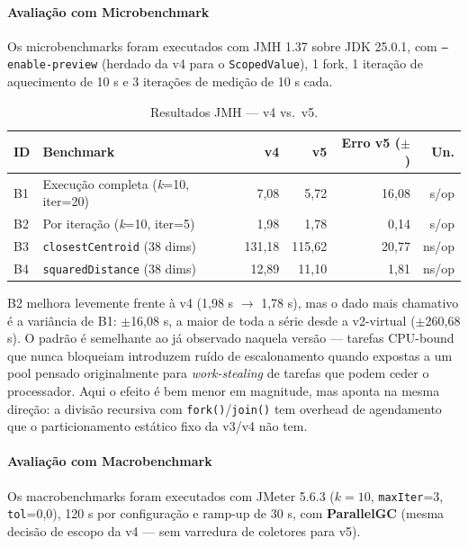 \paragraph{Avaliação com Microbenchmark}

Os microbenchmarks foram executados com JMH 1.37 sobre JDK 25.0.1, com
\texttt{--enable-preview} (herdado da v4 para o \texttt{ScopedValue}), 1
fork, 1 iteração de aquecimento de 10 s e 3 iterações de medição de 10 s
cada.

\begin{table}[H]
\centering
\begin{tabular}{lp{4.2cm}rrrr}
\hline
\textbf{ID} & \textbf{Benchmark} & \textbf{v4} & \textbf{v5} & \textbf{Erro v5 ($\pm$)} & \textbf{Un.} \\
\hline
B1 & Execução completa (\textit{k}=10, iter=20) & 7{,}08 & 5{,}72  & 16{,}08 & s/op \\
B2 & Por iteração (\textit{k}=10, iter=5)        & 1{,}98 & 1{,}78  &  0{,}14 & s/op \\
B3 & \texttt{closestCentroid} (38 dims)           & 131{,}18 & 115{,}62 & 20{,}77 & ns/op \\
B4 & \texttt{squaredDistance} (38 dims)           &  12{,}89 &  11{,}10 &  1{,}81 & ns/op \\
\hline
\end{tabular}
\caption{Resultados JMH --- v4 vs.\ v5.}
\label{tab:jmh-v5}
\end{table}

B2 melhora levemente frente à v4 (1,98 s $\to$ 1,78 s), mas o dado mais
chamativo é a variância de B1: $\pm$16,08 s, a maior de toda a série
desde a v2-virtual ($\pm$260,68 s). O padrão é semelhante ao já
observado naquela versão --- tarefas CPU-bound que nunca bloqueiam
introduzem ruído de escalonamento quando expostas a um pool pensado
originalmente para \textit{work-stealing} de tarefas que podem ceder o
processador. Aqui o efeito é bem menor em magnitude, mas aponta na
mesma direção: a divisão recursiva com \texttt{fork()}/\texttt{join()}
tem overhead de agendamento que o particionamento estático fixo da v3/v4
não tem.

\paragraph{Avaliação com Macrobenchmark}

Os macrobenchmarks foram executados com JMeter 5.6.3 ($k=10$,
\texttt{maxIter}=3, \texttt{tol}=0,0), 120 s por configuração e ramp-up
de 30 s, com \textbf{ParallelGC} (mesma decisão de escopo da v4 ---
sem varredura de coletores para v5).

